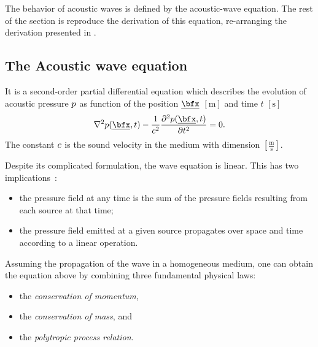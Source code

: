 The behavior of acoustic waves is defined by the acoustic-wave equation.
The rest of the section is reproduce the derivation of this equation, re-arranging the derivation presented in \cite{kuttruff2016room, pierce2019acoustics, marczuk2006modelling, avanzini2019sound}.

\subsection{The Acoustic wave equation}\label{subsec:acoustics:waveq}
It is a second-order partial differential equation
 which describes the evolution of acoustic pressure $p$
as function of the position $\positionMicrophone$ $[\si{\metre}]$ and time $t$ $[\si{\second}]$
\begin{equation}
    \label{eq:acoustics:wave}
    \knabla^2 \pressureSpaceTime - \frac{1}{\speedOfSound^2} \kpderiv[2]{\pressureSpaceTime}{t} = 0
    .
\end{equation}
The constant $c$ is the sound velocity in the medium with dimension $[\frac{\si{\metre}}{\si{\second}}]$.

Despite its complicated formulation, the wave equation is linear.
This has two implications~\cite{kuttruff2016room}:
\begin{itemize}
    \item the pressure field at any time is the sum of the pressure fields resulting from each source at that time;
    \item the pressure field emitted at a given source propagates over space and time according to a linear operation.
\end{itemize}


Assuming the propagation of the wave in a homogeneous medium, one can obtain the equation above by combining three fundamental physical laws:
\begin{itemize}
    \item the \textit{conservation of momentum},
    \item the \textit{conservation of mass}, and
    \item the \textit{polytropic process relation}.
\end{itemize}

